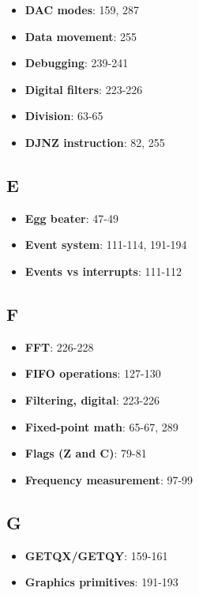 \documentclass[11pt]{book}
\providecommand{\tightlist}{%
  \setlength{\itemsep}{0pt}\setlength{\parskip}{0pt}}
\begin{document}
\begin{itemize}
\tightlist
\item
  \textbf{DAC modes}: 159, 287
\item
  \textbf{Data movement}: 255
\item
  \textbf{Debugging}: 239-241
\item
  \textbf{Digital filters}: 223-226
\item
  \textbf{Division}: 63-65
\item
  \textbf{DJNZ instruction}: 82, 255
\end{itemize}

\hypertarget{e}{%
\subsection{E}\label{e}}

\begin{itemize}
\tightlist
\item
  \textbf{Egg beater}: 47-49
\item
  \textbf{Event system}: 111-114, 191-194
\item
  \textbf{Events vs interrupts}: 111-112
\end{itemize}

\hypertarget{f}{%
\subsection{F}\label{f}}

\begin{itemize}
\tightlist
\item
  \textbf{FFT}: 226-228
\item
  \textbf{FIFO operations}: 127-130
\item
  \textbf{Filtering, digital}: 223-226
\item
  \textbf{Fixed-point math}: 65-67, 289
\item
  \textbf{Flags (Z and C)}: 79-81
\item
  \textbf{Frequency measurement}: 97-99
\end{itemize}

\hypertarget{g}{%
\subsection{G}\label{g}}

\begin{itemize}
\tightlist
\item
  \textbf{GETQX/GETQY}: 159-161
\item
  \textbf{Graphics primitives}: 191-193
\end{itemize}
\end{document}

